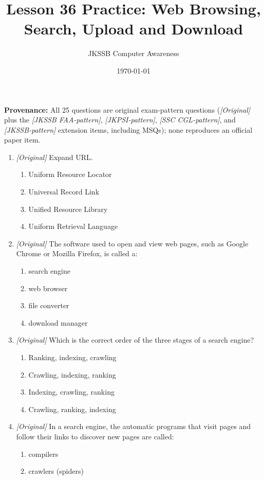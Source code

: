 \documentclass[11pt]{article}
\title{Lesson 36 Practice: Web Browsing, Search, Upload and Download}
\author{JKSSB Computer Awareness}
\date{\today}
\begin{document}
\maketitle
\noindent\textbf{Provenance:} All 25 questions are original exam-pattern questions (\textit{[Original]} plus the \textit{[JKSSB FAA-pattern]}, \textit{[JKPSI-pattern]}, \textit{[SSC CGL-pattern]}, and \textit{[JKSSB-pattern]} extension items, including MSQs); none reproduces an official paper item.

\begin{enumerate}[label=\textbf{Q\arabic*.}, leftmargin=*]
\item \textit{[Original]} Expand URL.
  \begin{enumerate}[label=\Alph*.]
    \item Uniform Resource Locator
    \item Universal Record Link
    \item Unified Resource Library
    \item Uniform Retrieval Language
  \end{enumerate}
\item \textit{[Original]} The software used to open and view web pages, such
  as Google Chrome or Mozilla Firefox, is called a:
  \begin{enumerate}[label=\Alph*.]
    \item search engine
    \item web browser
    \item file converter
    \item download manager
  \end{enumerate}
\item \textit{[Original]} Which is the correct order of the three stages of a
  search engine?
  \begin{enumerate}[label=\Alph*.]
    \item Ranking, indexing, crawling
    \item Crawling, indexing, ranking
    \item Indexing, crawling, ranking
    \item Crawling, ranking, indexing
  \end{enumerate}
\item \textit{[Original]} In a search engine, the automatic programs that
  visit pages and follow their links to discover new pages are called:
  \begin{enumerate}[label=\Alph*.]
    \item compilers
    \item crawlers (spiders)

\end{enumerate}
\end{enumerate}
\end{document}
